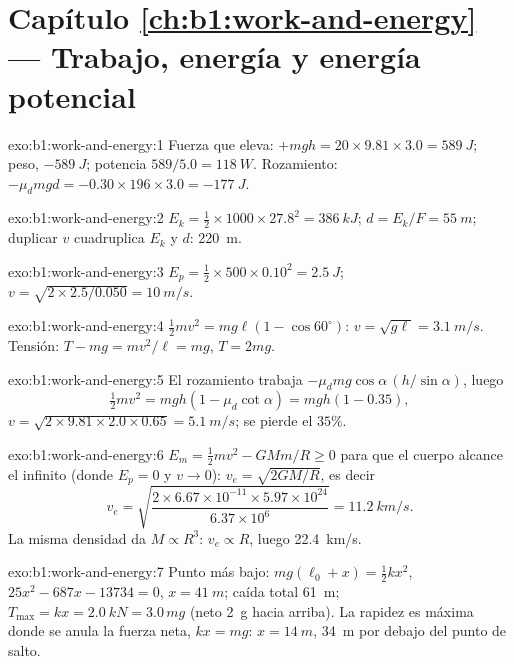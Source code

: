 \section*{Capítulo \ref{ch:b1:work-and-energy} --- Trabajo, energía y energía potencial}

\begin{solution}{exo:b1:work-and-energy:1}
Fuerza que eleva: $+mgh = 20 \times 9.81 \times 3.0 = \qty{589}{J}$; peso,
$-\qty{589}{J}$; potencia $589/5.0 = \qty{118}{W}$. Rozamiento: $-\mu_dmgd =
-0.30 \times 196 \times 3.0 = \qty{-177}{J}$.
\end{solution}

\begin{solution}{exo:b1:work-and-energy:2}
$E_k = \tfrac12 \times 1000 \times 27.8^2 = \qty{386}{kJ}$; $d = E_k/F =
\qty{55}{m}$; duplicar $v$ cuadruplica $E_k$ y $d$: \qty{220}{m}.
\end{solution}

\begin{solution}{exo:b1:work-and-energy:3}
$E_p = \tfrac12 \times 500 \times 0.10^2 = \qty{2.5}{J}$; $v = \sqrt{2 \times
2.5/0.050} = \qty{10}{m/s}$.
\end{solution}

\begin{solution}{exo:b1:work-and-energy:4}
$\tfrac12 mv^2 = mg\ell(1 - \cos 60^\circ)$: $v = \sqrt{g\ell} = \qty{3.1}{m/s}$.
Tensión: $T - mg = mv^2/\ell = mg$, $T = 2mg$.
\end{solution}

\begin{solution}{exo:b1:work-and-energy:5}
El rozamiento trabaja $-\mu_dmg\cos\alpha\,(h/\sin\alpha)$, luego
\[
\tfrac12 mv^2 = mgh(1 - \mu_d\cot\alpha) = mgh(1 - 0.35),
\]
$v = \sqrt{2 \times 9.81 \times 2.0 \times 0.65} = \qty{5.1}{m/s}$; se pierde el $35\%$.
\end{solution}

\begin{solution}{exo:b1:work-and-energy:6}
$E_m = \tfrac12 mv^2 - GMm/R \geq 0$ para que el cuerpo alcance el infinito
(donde $E_p = 0$ y $v \to 0$): $v_e = \sqrt{2GM/R}$, es decir
\[
v_e = \sqrt{\frac{2 \times 6.67\times10^{-11} \times 5.97\times10^{24}}{6.37\times10^6}}
= \qty{11.2}{km/s}.
\]
La misma densidad da $M \propto R^3$: $v_e \propto R$, luego \qty{22.4}{km/s}.
\end{solution}

\begin{solution}{exo:b1:work-and-energy:7}
Punto más bajo: $mg(\ell_0 + x) = \tfrac12 kx^2$, $25x^2 - 687x - 13734 = 0$,
$x = \qty{41}{m}$; caída total \qty{61}{m}; $T_{\max} = kx = \qty{2.0}{kN}
= 3.0\,mg$ (neto \qty{2}{g} hacia arriba). La rapidez es máxima donde se
anula la fuerza neta, $kx = mg$: $x = \qty{14}{m}$, \qty{34}{m} por debajo
del punto de salto.
\end{solution}

